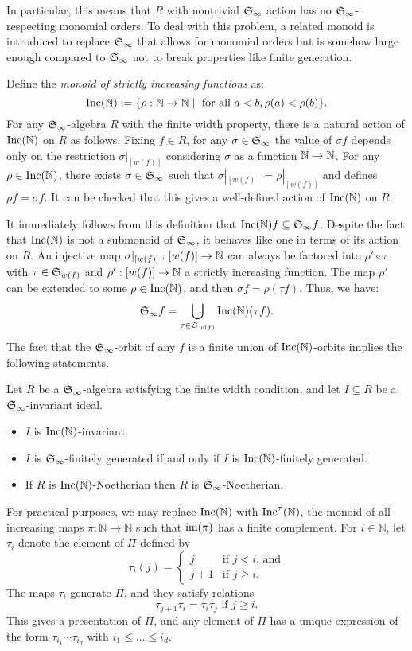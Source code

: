 In particular, this means that $R$ with nontrivial $\mathfrak S_\infty$ action has no $\mathfrak S_\infty$-respecting monomial orders.  To deal with this problem, a related monoid is introduced to replace $\mathfrak S_\infty$ that allows for monomial orders but is somehow large enough compared to $\mathfrak S_\infty$ not to break properties like finite generation.

Define the {\em monoid of strictly increasing functions} as:
\[ \operatorname{Inc}(\mathbb N) := \{ \rho:\mathbb N \to \mathbb N \mid \text{ for all } a < b, \rho(a) < \rho(b) \}. \]
For any $\mathfrak S_\infty$-algebra $R$ with the finite width property, there is a natural action of $\operatorname{Inc}(\mathbb N)$ on $R$ as follows.  Fixing $f \in R$, for any $\sigma \in \mathfrak S_\infty$ the value of $\sigma f$ depends only on the restriction $\sigma|_{[w(f)]}$ considering $\sigma$ as a function $\mathbb N \to \mathbb N$.  For any $\rho \in \operatorname{Inc}(\mathbb N)$, there exists $\sigma \in \mathfrak S_\infty$ such that $\sigma|_{[w(f)]} = \rho|_{[w(f)]}$ and defines $\rho f = \sigma f$.  It can be checked that this gives a well-defined action of $\operatorname{Inc}(\mathbb N)$ on $R$.

It immediately follows from this definition that $\operatorname{Inc}(\mathbb N) f \subseteq \mathfrak S_\infty f$.  Despite the fact that $\operatorname{Inc}(\mathbb N)$ is not a submonoid of $\mathfrak S_\infty$, it behaves like one in terms of its action on $R$.  An injective map $\sigma|_{[w(f)]}: [w(f)] \to \mathbb N$ can always be factored into $\rho' \circ \tau$ with $\tau \in \mathfrak S_{w(f)}$ and $\rho':[w(f)] \to \mathbb N$ a strictly increasing function.  The map $\rho'$ can be extended to some $\rho \in \operatorname{Inc}(\mathbb N)$, and then $\sigma f = \rho (\tau f)$.  Thus, we have:
 \[ \mathfrak S_\infty f = \bigcup_{\tau \in \mathfrak S_{w(f)}} \operatorname{Inc}(\mathbb N)(\tau f). \]
The fact that the $\mathfrak S_\infty$-orbit of any $f$ is a finite union of $\operatorname{Inc}(\mathbb N)$-orbits implies the following statements.

\begin{proposition}
 Let $R$ be a $\mathfrak S_\infty$-algebra satisfying the finite width condition, and let $I\subseteq R$ be a $\mathfrak S_\infty$-invariant ideal.
 \begin{itemize}
  \item $I$ is $\operatorname{Inc}(\mathbb N)$-invariant.
  \item $I$ is $\mathfrak S_\infty$-finitely generated if and only if $I$ is $\operatorname{Inc}(\mathbb N)$-finitely generated.
  \item If $R$ is $\operatorname{Inc}(\mathbb N)$-Noetherian then $R$ is $\mathfrak S_\infty$-Noetherian.
 \end{itemize}
\end{proposition}

\begin{remark}\label{rem:IncT}
For practical purposes, we may replace $\operatorname{Inc}(\mathbb N)$ with $\operatorname{Inc}^\tau(\mathbb N)$, the monoid of all increasing maps
$\pi:\mathbb N \to \mathbb N$ such that $\operatorname{im}(\pi)$ has a finite complement. 
For $i \in \mathbb N$, let $\tau_i$ denote the element of $\Pi$ defined by
\[ \tau_i(j)=
\begin{cases} 
	j & \text{if $j<i$, and}\\
	j+1 & \text{if $j \geq i$.}
\end{cases}
\]
The maps $\tau_i$ generate $\Pi$, and they satisfy relations
\[ \tau_{j+1}\tau_i=\tau_i \tau_j \text{ if }j \geq i. \]
This gives a presentation of $\Pi$, and any element of $\Pi$
has a unique expression of the form $\tau_{i_1} \cdots \tau_{i_d}$
with $i_1 \leq \ldots \leq i_d$.
\end{remark}

